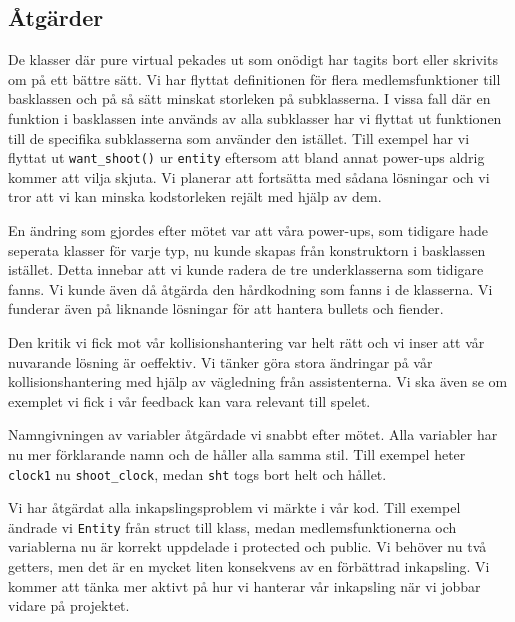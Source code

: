 \documentclass{TDP003mall}
\begin{document}
\subsection{Åtgärder}
De klasser där pure virtual pekades ut som onödigt har tagits bort eller skrivits om på ett bättre sätt. 
Vi har flyttat definitionen för flera medlemsfunktioner till basklassen och på så sätt minskat storleken på subklasserna. 
I vissa fall där en funktion i basklassen inte används av alla subklasser har vi flyttat ut funktionen till de specifika subklasserna som använder den istället. 
Till exempel har vi flyttat ut \texttt{want\_shoot()} ur \texttt{entity} eftersom att bland annat power-ups aldrig kommer att vilja skjuta. 
Vi planerar att fortsätta med sådana lösningar och vi tror att vi kan minska kodstorleken rejält med hjälp av dem.

En ändring som gjordes efter mötet var att våra power-ups, som tidigare hade seperata klasser för varje typ, nu kunde skapas från konstruktorn i basklassen istället. 
Detta innebar att vi kunde radera de tre underklasserna som tidigare fanns. Vi kunde även då åtgärda den hårdkodning som fanns i de klasserna. 
Vi funderar även på liknande lösningar för att hantera bullets och fiender.  

Den kritik vi fick mot vår kollisionshantering var helt rätt och vi inser att vår nuvarande lösning är oeffektiv. 
Vi tänker göra stora ändringar på vår kollisionshantering med hjälp av vägledning från assistenterna. Vi ska även se om exemplet vi fick i vår feedback kan vara relevant till spelet.

Namngivningen av variabler åtgärdade vi snabbt efter mötet. Alla variabler har nu mer förklarande namn och de håller alla samma stil. 
Till exempel heter \texttt{clock1} nu \texttt{shoot\_clock}, medan \texttt{sht} togs bort helt och hållet.

Vi har åtgärdat alla inkapslingsproblem vi märkte i vår kod. Till exempel ändrade vi \texttt{Entity} från struct till klass, 
medan medlemsfunktionerna och variablerna nu är korrekt uppdelade i protected och public. Vi behöver nu två getters, men det är en mycket liten konsekvens av en förbättrad inkapsling. 
Vi kommer att tänka mer aktivt på hur vi hanterar vår inkapsling när vi jobbar vidare på projektet.
\end{document}
